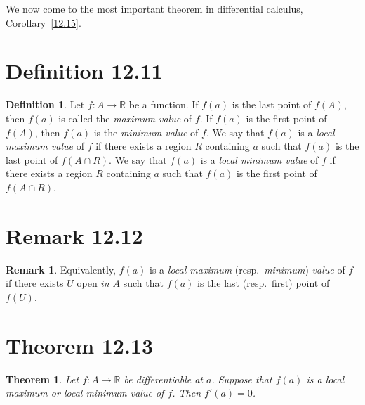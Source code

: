 \documentclass[openany, amssymb, psamsfonts]{amsart}
\newcommand{\bbR}{\mathbb{R}}
\newtheorem{thm}{Theorem}[section]
\theoremstyle{definition}
\newtheorem{defn}{Definition}[section]
\newtheorem{rem}{Remark}[section]
\numberwithin{equation}{section}
\begin{document}
We now come to the most important theorem in differential calculus, Corollary~\ref{12.15}.

\section*{Definition 12.11}
\begin{defn} \label{12.11}
	Let $f\colon A \to \bbR$ be a function. If $f(a)$ is the last point of $f(A)$, then $f(a)$ is called the \emph{maximum value} of $f$. If $f(a)$ is the first point of $f(A)$, then $f(a)$ is the \emph{minimum value} of $f$. We say that $f(a)$ is a \emph{local maximum value} of $f$ if there exists a region $R$ containing $a$ such that $f(a)$ is the last point of $f(A \cap R)$. We say that $f(a)$ is a \emph{local minimum value} of $f$ if there exists a region $R$ containing $a$ such that $f(a)$ is the first point of $f(A \cap R)$.
\end{defn}

\section*{Remark 12.12}
\begin{rem}
	Equivalently, $f(a)$ is a \emph{local maximum} (resp.\ \emph{minimum}) \emph{value} of $f$ if there exists $U$ open \emph{in $A$} such that $f(a)$ is the last (resp.\ first) point of $f(U)$.
 \end{rem}

\section*{Theorem 12.13}
\begin{thm}
\label{12.13}
Let $f\colon A \to \bbR$ be differentiable at $a$. Suppose that $f(a)$ is a local maximum or local minimum value of $f$. Then $f'(a) = 0$.
\end{thm}
\end{document}
